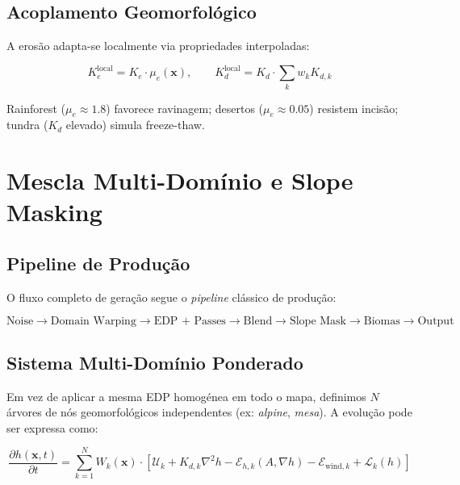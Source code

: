 \documentclass[11pt,a4paper]{article}
\begin{document}
\subsection{Acoplamento Geomorfológico}

A erosão adapta-se localmente via propriedades interpoladas:

\begin{equation}
  K_e^{\text{local}} = K_e \cdot \mu_e(\mathbf{x}), \qquad
  K_d^{\text{local}} = K_d \cdot \sum_k w_k K_{d,k}
  \label{eq:biome-erosion-coupling}
\end{equation}

Rainforest ($\mu_e \approx 1.8$) favorece ravinagem; desertos ($\mu_e \approx 0.05$)
resistem incisão; tundra ($K_d$ elevado) simula freeze-thaw.

\section{Mescla Multi-Domínio e Slope Masking}

\subsection{Pipeline de Produção}

O fluxo completo de geração segue o \emph{pipeline} clássico de produção:

\begin{equation}
  \text{Noise} \to \text{Domain Warping} \to \text{EDP + Passes}
  \to \text{Blend} \to \text{Slope Mask} \to \text{Biomas} \to \text{Output}
  \label{eq:pipeline}
\end{equation}

\subsection{Sistema Multi-Domínio Ponderado}

Em vez de aplicar a mesma EDP homogénea em todo o mapa, definimos $N$ árvores de nós
geomorfológicos independentes (ex: \emph{alpine}, \emph{mesa}). A evolução pode ser
expressa como:

\begin{equation}
  \frac{\partial h(\mathbf{x}, t)}{\partial t}
  = \sum_{k=1}^{N} W_k(\mathbf{x}) \cdot \left[
    \mathcal{U}_k + K_{d,k} \nabla^2 h - \mathcal{E}_{h,k}(A, \nabla h)
    - \mathcal{E}_{\text{wind},k} + \mathcal{L}_k(h)
  \right]
  \label{eq:multi-domain}
\end{equation}
\end{document}
